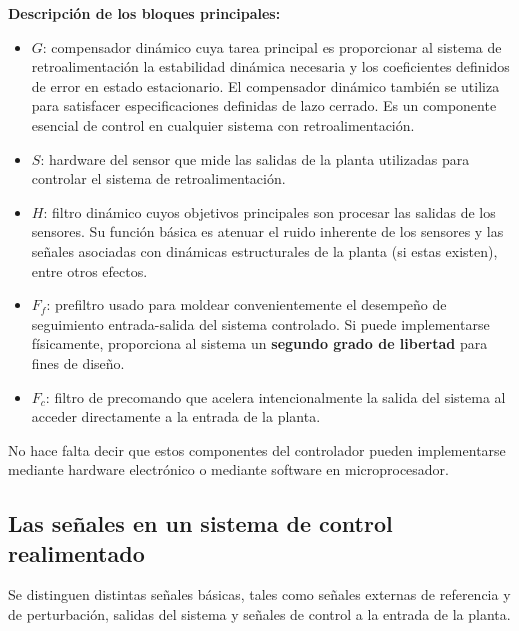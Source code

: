 \textbf{Descripción de los bloques principales:}

\begin{itemize}
  \item \textbf{\(G\)}: compensador dinámico cuya tarea principal es proporcionar al sistema de retroalimentación la estabilidad dinámica necesaria y los coeficientes definidos de error en estado estacionario. El compensador dinámico también se utiliza para satisfacer especificaciones definidas de lazo cerrado. Es un componente esencial de control en cualquier sistema con retroalimentación.
  \item \textbf{\(S\)}: hardware del sensor que mide las salidas de la planta utilizadas para controlar el sistema de retroalimentación.
  \item \textbf{\(H\)}: filtro dinámico cuyos objetivos principales son procesar las salidas de los sensores. Su función básica es atenuar el ruido inherente de los sensores y las señales asociadas con dinámicas estructurales de la planta (si estas existen), entre otros efectos.
  \item \textbf{\(F_f\)}: prefiltro usado para moldear convenientemente el desempeño de seguimiento entrada-salida del sistema controlado. Si puede implementarse físicamente, proporciona al sistema un \textbf{segundo grado de libertad} para fines de diseño.
  \item \textbf{\(F_c\)}: filtro de precomando que acelera intencionalmente la salida del sistema al acceder directamente a la entrada de la planta.
\end{itemize}

No hace falta decir que estos componentes del controlador pueden implementarse mediante hardware electrónico o mediante software en microprocesador.

\subsection{Las señales en un sistema de control realimentado}
Se distinguen distintas señales básicas, tales como señales externas de referencia y de perturbación, salidas del sistema y señales de control a la entrada de la planta.

